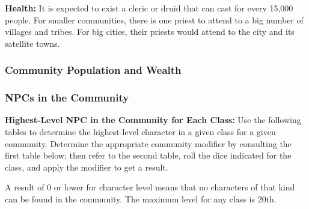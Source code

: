 \textbf{Health:} It is expected to exist a cleric or druid that can cast  for every 15,000 people. For smaller communities, there is one priest to attend to a big number of villages and tribes. For big cities, their priests would attend to the city and its satellite towns.

\subsubsection{Community Population and Wealth}
\subsubsection{NPCs in the Community}
\textbf{Highest-Level NPC in the Community for Each Class:} Use the following tables to determine the highest-level character in a given class for a given community. Determine the appropriate community modifier by consulting the first table below; then refer to the second table, roll the dice indicated for the class, and apply the modifier to get a result.

A result of 0 or lower for character level means that no characters of that kind can be found in the community. The maximum level for any class is 20th.



